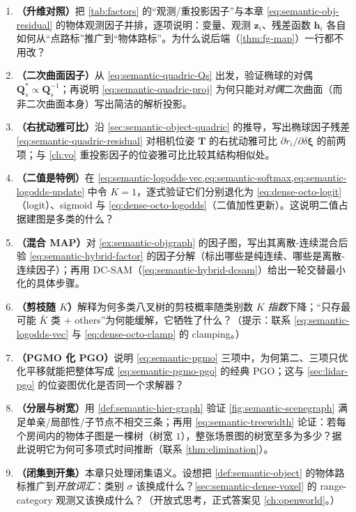 \begin{practice}[本章习题]
\begin{enumerate}
  \item \textbf{（升维对照）}把 \cref{tab:factors} 的“观测/重投影因子”与本章 \cref{eq:semantic-obj-residual} 的物体观测因子并排，逐项说明：变量、观测 $\mathbf{z}_i$、残差函数 $\mathbf{h}_i$ 各自如何从“点路标”推广到“物体路标”。为什么说后端（\cref{thm:fg-map}）一行都不用改？
  \item \textbf{（二次曲面因子）}从 \cref{eq:semantic-quadric-Qs} 出发，验证椭球的对偶 $\mathbf{Q}_s^{*}\propto\mathbf{Q}_s^{-1}$；再说明 \cref{eq:semantic-quadric-proj} 为何只能对\emph{对偶}二次曲面（而非二次曲面本身）写出简洁的解析投影。
  \item \textbf{（右扰动雅可比）}沿 \cref{sec:semantic-object-quadric} 的推导，写出椭球因子残差 \cref{eq:semantic-quadric-residual} 对相机位姿 $\mathbf{T}$ 的右扰动雅可比 $\partial r_i/\partial\delta\boldsymbol\xi$ 的前两项；与 \cref{ch:vo} 重投影因子的位姿雅可比比较其结构相似处。
  \item \textbf{（二值是特例）}在 \cref{eq:semantic-logodds-vec,eq:semantic-softmax,eq:semantic-logodds-update} 中令 $K{=}1$，逐式验证它们分别退化为 \cref{eq:dense-octo-logit}（logit）、sigmoid 与 \cref{eq:dense-octo-logodds}（二值加性更新）。这说明二值占据建图是多类的什么？
  \item \textbf{（混合 MAP）}对 \cref{ex:semantic-objgraph} 的因子图，写出其离散-连续混合后验 \cref{eq:semantic-hybrid-factor} 的因子分解（标出哪些是纯连续、哪些是离散-连续因子）；再用 DC-SAM（\cref{eq:semantic-hybrid-dcsam}）给出一轮交替最小化的具体步骤。
  \item \textbf{（剪枝随 $K$）}解释为何多类八叉树的剪枝概率随类别数 $K$ \emph{指数}下降；“只存最可能 $\bar K$ 类 $+$ others”为何能缓解，它牺牲了什么？（提示：联系 \cref{eq:semantic-logodds-vec} 与 \cref{eq:dense-octo-clamp} 的 clamping。）
  \item \textbf{（PGMO 化 PGO）}说明 \cref{eq:semantic-pgmo} 三项中，为何第二、三项只优化平移就能把整体写成 \cref{eq:semantic-pgmo-pgo} 的经典 PGO；这与 \cref{sec:lidar-pgo} 的位姿图优化是否同一个求解器？
  \item \textbf{（分层与树宽）}用 \cref{def:semantic-hier-graph} 验证 \cref{fig:semantic-scenegraph} 满足单亲/局部性/子节点不相交三条；再用 \cref{eq:semantic-treewidth} 论证：若每个房间内的物体子图是一棵树（树宽 $1$），整张场景图的树宽至多为多少？据此说明它为何可多项式时间推断（联系 \cref{thm:elimination}）。
  \item \textbf{（闭集到开集）}本章只处理闭集语义。设想把 \cref{def:semantic-object} 的物体路标推广到\emph{开放词汇}：类别 $\sigma$ 该换成什么？\cref{sec:semantic-dense-voxel} 的 range-category 观测又该换成什么？（开放式思考，正式答案见 \cref{ch:openworld}。）
\end{enumerate}
\end{practice}
